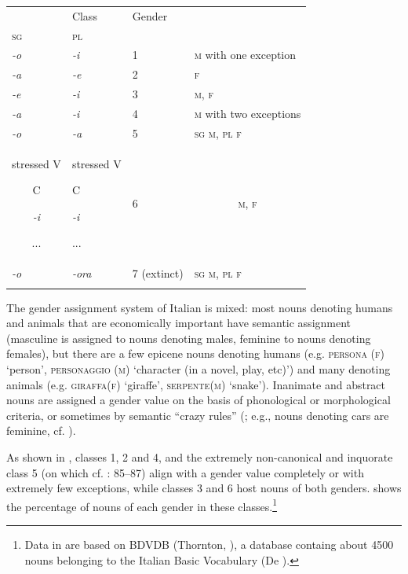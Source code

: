 \documentclass[output=paper]{langscibook}
\begin{document}
\begin{tabularx}{\textwidth}{XXXX}

\lsptoprule

\multicolumn{2}{c}{Nouns’ endings} & Class & Gender\\
\textsc{sg} & \textsc{pl} &  & \\
\textit{{}-o} & \textit{{}-i} & 1 & \textsc{m} with one exception\\
\textit{{}-a} & \textit{{}-e} & 2 & \textsc{f} \\
\textit{{}-e} & \textit{{}-i} & 3 & \textsc{m,} \textsc{f}\\
\textit{{}-a} & \textit{{}-i} & 4 & \textsc{m} with two exceptions\\
\textit{{}-o} & \textit{{}-a} & 5 & \textsc{sg} \textsc{m}, \textsc{pl} \textsc{f}\\
\multicolumn{1}{c}{stressed V

C

\textit{{}-i}

...} & stressed V

C

\textit{{}-i}

... & 6 & \multicolumn{1}{c}{\textsc{m,} \textsc{f}}\\
\textit{{}-o} & \textit{{}-ora} & 7 (extinct) & \textsc{sg} \textsc{m}, \textsc{pl} \textsc{f}\\
\lspbottomrule
\end{tabularx}
The gender assignment system of Italian is mixed: most nouns denoting humans and animals that are economically important have semantic assignment (masculine is assigned to nouns denoting males, feminine to nouns denoting females), but there are a few epicene nouns denoting humans (e.g. \textsc{persona} (\textsc{f}) ‘person’, \textsc{personaggio} \textsc{(m)} ‘character (in a novel, play, etc)’) and many denoting animals (e.g. \textsc{giraffa(f)} ‘giraffe’, \textsc{serpente(m}) ‘snake’). Inanimate and abstract nouns are assigned a gender value on the basis of phonological or morphological criteria, or sometimes by semantic “crazy rules” (\citealt{Enger2009}; e.g., nouns denoting cars are feminine, cf. \citealt{Thornton2001}).

As shown in , classes 1, 2 and 4, and the extremely non-canonical and inquorate class 5 (on which cf. \citealt{Thornton2019}: 85–87) align with a gender value completely or with extremely few exceptions, while classes 3 and 6 host nouns of both genders.  shows the percentage of nouns of each gender in these classes.\footnote{Data in  are based on BDVDB (Thornton, \citealt{IacobiniBurani1997}), a database containg about 4500 nouns belonging to the Italian Basic Vocabulary (De \citealt{Mauro1989}).}
\end{document}
